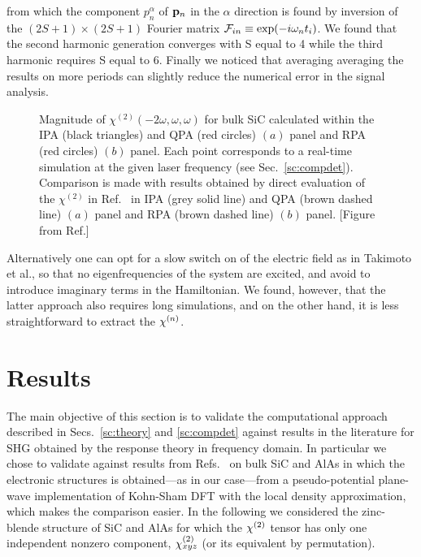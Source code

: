\label{eq:fouinv}
\ee 
from which the component $p^\alpha_n$ of ${\bf p}_n$ in the $\alpha$ direction is found by inversion of the $(2S+1)\times(2S+1)$ Fourier matrix ${\cal F}_{in} \equiv \exp(-i\omega_n t_i)$. We found that the second harmonic generation converges with S equal to 4 while the third harmonic requires S equal to 6. Finally we noticed that averaging averaging the results on more periods can slightly reduce the numerical error in the signal analysis. \\
\begin{figure}[ht]
\centering
{}
\caption{\footnotesize{Magnitude of $\chi^{(2)}(-2\omega,\omega,\omega)$ for bulk SiC calculated within the IPA (black triangles) and QPA (red circles) $(a)$ panel and RPA (red circles) $(b)$ panel. Each point corresponds to a real-time simulation at the given laser frequency (see Sec.~\ref{sc:compdet}). Comparison is made with results obtained \ai by direct evaluation of the $\chi^{(2)}$ in Ref.~\cite{PhysRevB.82.235201} in IPA (grey solid line) and QPA (brown dashed line) $(a)$  panel and RPA (brown dashed line) $(b)$ panel.  \label{fg:SiCQPRPA} [Figure from Ref.\cite{nloptics2013}]}}
\end{figure}
Alternatively one can opt for a slow switch on of the electric field as in Takimoto et al.,\cite{takimoto:154114} so that no eigenfrequencies of the system are excited, and avoid to introduce imaginary terms in the Hamiltonian. We found, however, that the latter approach also requires long simulations, and on the other hand, it is less straightforward to extract the $\chi^{(n)}$.


\section{Results}\label{sc:results}
%                                                                                                                     
The main objective of this section is to validate the computational approach described in Secs.~\ref{sc:theory} and \ref{sc:compdet} against results in the literature for SHG obtained by the response theory in frequency domain. In particular we chose to validate against results from Refs.~\cite{PhysRevB.82.235201,PSSB.427.1984} on bulk SiC and AlAs in which the electronic structures is obtained---as in our case---from a pseudo-potential plane-wave implementation of Kohn-Sham DFT with the local density approximation, which makes the comparison easier.
In the following we considered the zinc-blende structure of SiC and AlAs for which the $\chi^{(2)}$ tensor has only one independent nonzero component, $\chi^{(2)}_{xyz}$ (or its equivalent by permutation).

